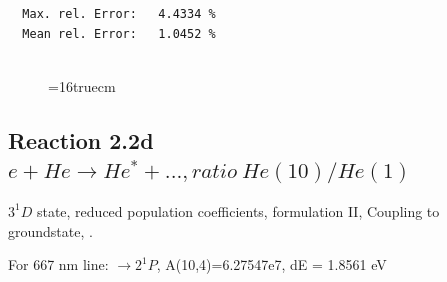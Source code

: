 \documentclass[12pt,dvips]{article}
\begin{document}
\begin{small}
\begin{verbatim}
  Max. rel. Error:   4.4334 %
  Mean rel. Error:   1.0452 %


\end{verbatim}\end{small}
\begin{figure} \label{2.2c}
\epsfxsize=16truecm
\end{figure}
\newpage


\subsection{
  Reaction 2.2d $e + He \rightarrow He^* + ...,  ratio ~ He(10)/He(1)$
}

  $3^1D$ state,
  reduced population coefficients, formulation II,
  Coupling to groundstate, \cite{kn:Fujimoto}.

  For 667 nm line: $\rightarrow 2^1P$, A(10,4)=6.27547e7, dE = 1.8561 eV
\end{document}
